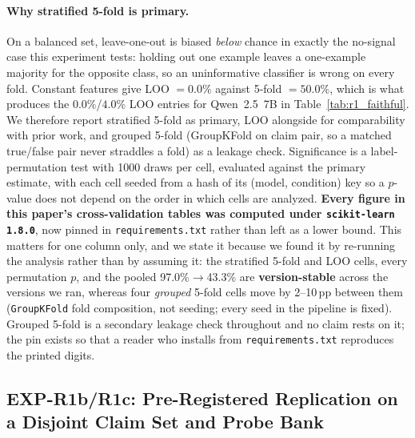 \paragraph{Why stratified 5-fold is primary.} On a balanced set, leave-one-out is biased \emph{below} chance in exactly the no-signal case this experiment tests: holding out one example leaves a one-example majority for the opposite class, so an uninformative classifier is wrong on every fold. Constant features give LOO $=0.0\%$ against 5-fold $=50.0\%$, which is what produces the $0.0\%$/$4.0\%$ LOO entries for Qwen~2.5~7B in Table~\ref{tab:r1_faithful}. We therefore report stratified 5-fold as primary, LOO alongside for comparability with prior work, and grouped 5-fold (GroupKFold on claim pair, so a matched true/false pair never straddles a fold) as a leakage check. Significance is a label-permutation test with 1000 draws per cell, evaluated against the primary estimate, with each cell seeded from a hash of its (model, condition) key so a $p$-value does not depend on the order in which cells are analyzed. \textbf{Every figure in this paper's cross-validation tables was computed under \texttt{scikit-learn 1.8.0}}, now pinned in \texttt{requirements.txt} rather than left as a lower bound. This matters for one column only, and we state it because we found it by re-running the analysis rather than by assuming it: the stratified 5-fold and LOO cells, every permutation $p$, and the pooled 97.0\%$\to$43.3\% are \textbf{version-stable} across the versions we ran, whereas four \emph{grouped} 5-fold cells move by 2--10\,pp between them (\texttt{GroupKFold} fold composition, not seeding; every seed in the pipeline is fixed). Grouped 5-fold is a secondary leakage check throughout and no claim rests on it; the pin exists so that a reader who installs from \texttt{requirements.txt} reproduces the printed digits.

\subsection{EXP-R1b/R1c: Pre-Registered Replication on a Disjoint Claim Set and Probe Bank}
\label{app:r1b}

